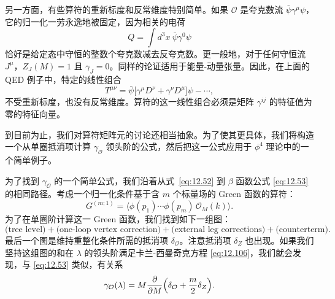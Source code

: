 另一方面，有些算符的重新标度和反常维度特别简单。如果 $\mathcal{O}$ 是夸克数流 $\bar{\psi}\gamma^\mu\psi$，它的归一化一劳永逸地被固定，因为相关的电荷
\begin{equation}
  Q = \int d^3x\ \bar{\psi}\gamma^0\psi
\end{equation}
恰好是给定态中守恒的整数个夸克数减去反夸克数。更一般地，对于任何守恒流 $J^\mu$，$Z_J(M) = 1$ 且 $\gamma_J = 0$。同样的论证适用于能量-动量张量。因此，在上面的 QED 例子中，特定的线性组合
\begin{equation}
  T^{\mu\nu} = \bar{\psi}\bigl[ \gamma^\mu D^\nu + \gamma^\nu D^\mu \bigr]\psi
    - \cdots ,
  \label{eq:12.110}
\end{equation}
不受重新标度，也没有反常维度。算符的这一线性组合必须是矩阵 $\gamma^{ij}$ 的特征值为零的特征向量。

到目前为止，我们对算符矩阵元的讨论还相当抽象。为了使其更具体，我们将构造一个从单圈抵消项计算 $\gamma_{\mathcal{O}}$ 领头阶的公式，然后把这一公式应用于 $\phi^4$ 理论中的一个简单例子。

为了找到 $\gamma_{\mathcal{O}}$ 的一个简单公式，我们沿着从式~\eqref{eq:12.52} 到 $\beta$ 函数公式 \eqref{eq:12.53} 的相同路径。考虑一个归一化条件基于含 $m$ 个标量场的 Green 函数的算符：
\begin{equation}
  G^{(m;1)} = \bigl\langle \phi(p_1)\cdots\phi(p_m)\,\mathcal{O}_M(k)
    \bigr\rangle .
  \label{eq:12.111}
\end{equation}
为了在单圈阶计算这一 Green 函数，我们找到如下一组图：
\begin{equation}
  \text{(tree level)} + \text{(one-loop vertex correction)} + \text{(external
    leg corrections)} + \text{(counterterm)} .
\end{equation}
最后一个图是维持重整化条件所需的抵消项 $\delta_{\mathcal{O}}$。注意抵消项 $\delta_Z$ 也出现。如果我们坚持这组图的和在 $\lambda$ 的领头阶满足卡兰-西曼奇克方程 \eqref{eq:12.106}，我们就会发现，与 \eqref{eq:12.53} 类似，有关系
\begin{equation}
  \gamma_{\mathcal{O}}(\lambda) = M\frac{\partial}{\partial M}\Bigl(
    \delta_{\mathcal{O}} + \frac{m}{2}\delta_Z \Bigr) .
  \label{eq:12.112}
\end{equation}

